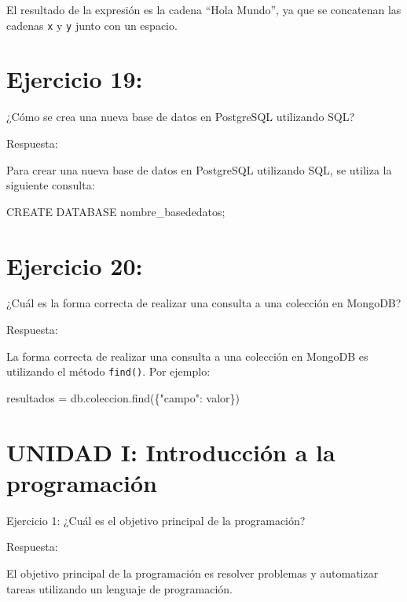 \documentclass[
  a4paper,
  DIV=11,
  numbers=noendperiod,
  onepage,
  openany]{scrreprt}
\newenvironment{Shaded}{\begin{snugshade}}{\end{snugshade}}
\newcommand{\KeywordTok}[1]{\textcolor[rgb]{0.00,0.23,0.31}{#1}}
\newcommand{\NormalTok}[1]{\textcolor[rgb]{0.00,0.23,0.31}{#1}}
\newcommand{\OperatorTok}[1]{\textcolor[rgb]{0.37,0.37,0.37}{#1}}
\newcommand{\StringTok}[1]{\textcolor[rgb]{0.13,0.47,0.30}{#1}}
\begin{document}
El resultado de la expresión es la cadena ``Hola Mundo'', ya que se
concatenan las cadenas \texttt{x} y \texttt{y} junto con un espacio.

\chapter{Ejercicio 19:}\label{ejercicio-19}

¿Cómo se crea una nueva base de datos en PostgreSQL utilizando SQL?

Respuesta:

Para crear una nueva base de datos en PostgreSQL utilizando SQL, se
utiliza la siguiente consulta:

\begin{Shaded}
\begin{Highlighting}[]
\KeywordTok{CREATE} \KeywordTok{DATABASE}\NormalTok{ nombre\_basededatos;}
\end{Highlighting}
\end{Shaded}

\chapter{Ejercicio 20:}\label{ejercicio-20}

¿Cuál es la forma correcta de realizar una consulta a una colección en
MongoDB?

Respuesta:

La forma correcta de realizar una consulta a una colección en MongoDB es
utilizando el método \texttt{find()}. Por ejemplo:

\begin{Shaded}
\begin{Highlighting}[]
\NormalTok{resultados }\OperatorTok{=}\NormalTok{ db.coleccion.find(\{}\StringTok{"campo"}\NormalTok{: valor\})}
\end{Highlighting}
\end{Shaded}

\chapter{UNIDAD I: Introducción a la
programación}\label{unidad-i-introducciuxf3n-a-la-programaciuxf3n}

Ejercicio 1: ¿Cuál es el objetivo principal de la programación?

Respuesta:

El objetivo principal de la programación es resolver problemas y
automatizar tareas utilizando un lenguaje de programación.
\end{document}

